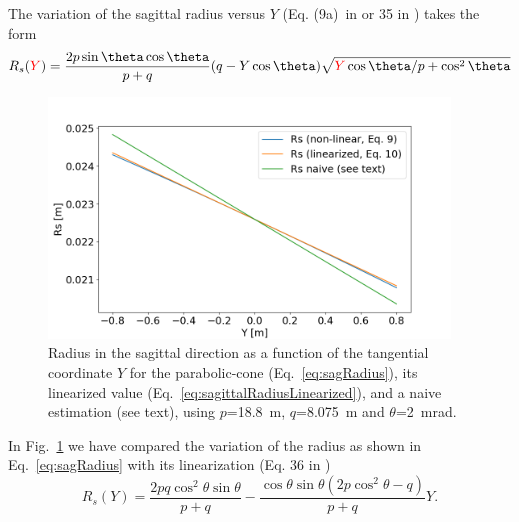 \documentclass{iucr}              %
\newcommand{\inred}[1]{{\color{red}#1}}
\begin{document}
\inred{The variation of the sagittal radius versus $Y$  (Eq. (9a)\ in \cite{Valeriy2020c} or 35 in \cite{part2}) takes the form
\begin{equation}
\label{eq:sagRadius}
R_s(\inred{Y}) = \frac{2  p \sin\theta \cos\theta}{p + q} (q - Y \cos\theta)   \sqrt{\inred{Y} \cos\theta / p + \cos^2\theta}
\end{equation}
}

\begin{figure}
\label{fig:sagittalRadius}
\centering
\includegraphics[width=0.95\textwidth]{figures/sagittalradius.png}
\caption{Radius in the sagittal direction as a function of the tangential coordinate $Y$ for the parabolic-cone (Eq.~\ref{eq:sagRadius}), its linearized value (Eq.~\ref{eq:sagittalRadiusLinearized}), and a naive estimation (see text), using $p$=18.8~m, $q$=8.075~m and $\theta$=2~mrad.
}
\end{figure}

In Fig.~\ref{fig:sagittalRadius} we have compared the variation of the radius as shown in Eq.~\ref{eq:sagRadius} with its linearization (Eq. 36 in \cite{part2})
\begin{equation}
\label{eq:sagittalRadiusLinearized}
R_s(Y) = \frac{2p q \cos^2\theta \sin\theta  }{p + q} - 
\frac{\cos\theta \sin\theta (2 p \cos^2\theta - q)}{p + q} Y.
\end{equation}

\end{document}
